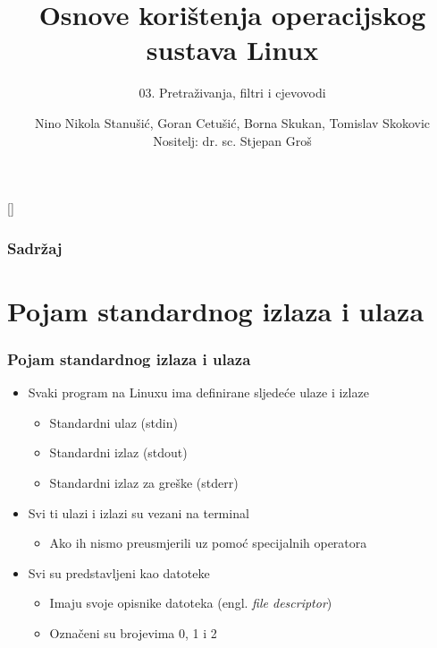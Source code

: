 \documentclass{beamer}
\title{Osnove korištenja operacijskog sustava Linux}
\subtitle{03. Pretraživanja, filtri i cjevovodi}
\author[Nino Nikola Stanušić, Goran Cetušić, Borna Skukan, Tomislav Skokovic]{Nino Nikola Stanušić, Goran Cetušić, Borna Skukan, Tomislav Skokovic\\{\small Nositelj: dr. sc. Stjepan Groš}}
\institute[FER]{Sveučilište u Zagrebu \\
				Fakultet elektrotehnike i računarstva}
\date{\todayiso}
\begin{document}
{
[] %

\begin{frame}
\maketitle
\end{frame}
}

\begin{frame}
\frametitle{Sadržaj}
\tableofcontents
\end{frame}

\section{Pojam standardnog izlaza i ulaza}
\begin{frame}[t]
\frametitle{Pojam standardnog izlaza i ulaza}
\begin{itemize}
  \item Svaki program na Linuxu ima definirane sljedeće ulaze i izlaze
  \begin{itemize}
    \item Standardni ulaz (stdin)
    \item Standardni izlaz (stdout)
    \item Standardni izlaz za greške (stderr)
  \end{itemize}
  \item Svi ti ulazi i izlazi su vezani na terminal
  \begin{itemize}
    \item Ako ih nismo preusmjerili uz pomoć specijalnih operatora
  \end{itemize}
  \item Svi su predstavljeni kao datoteke
  \begin{itemize}
    \item Imaju svoje opisnike datoteka (engl. \emph{file descriptor})
    \item Označeni su brojevima 0, 1 i 2
  \end{itemize}
\end{itemize}
\end{frame}
\end{document}
